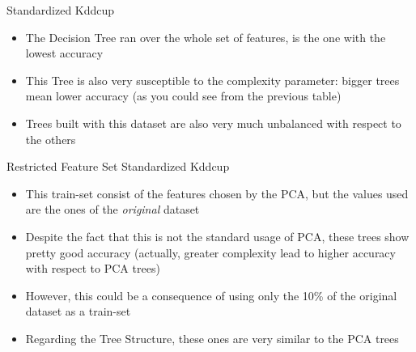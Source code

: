 	\begin{frame}
		\begin{block}{Standardized Kddcup}
			\begin{itemize}
				\vspace{0.3cm}
				\item The Decision Tree ran over the whole set of features, is the one with the lowest accuracy
				\vspace{0.3cm}
				\item This Tree is also very susceptible to the complexity parameter: bigger trees mean lower accuracy (as you could see from the previous table)
				\vspace{0.3cm}
				\item Trees built with this dataset are also very much unbalanced with respect to the others
				\vspace{0.3cm}
			\end{itemize}
		\end{block}
	\end{frame}
	
		\begin{frame}
		\begin{block}{Restricted Feature Set Standardized Kddcup}
			\begin{itemize}
				\vspace{0.3cm}
				\item This train-set consist of the features chosen by the PCA, but the values used are the ones of the \emph{original} dataset
				\vspace{0.3cm}
				\item Despite the fact that this is not the standard usage of PCA, these trees show pretty good accuracy (actually, greater complexity lead to higher accuracy with respect to PCA trees)
				\vspace{0.3cm}
				\item However, this could be a consequence of using only the 10\% of the original dataset as a train-set
				\vspace{0.3cm}
				\item Regarding the Tree Structure, these ones are very similar to the PCA trees
				\vspace{0.3cm}
			\end{itemize}
		\end{block}
	\end{frame}
	
